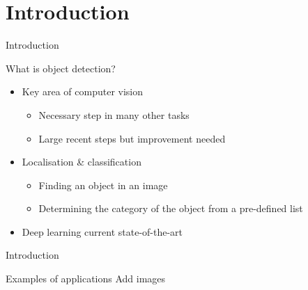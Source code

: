 \section{Introduction}
\begin{frame}{Introduction}{}
    \begin{block}{}
        What is object detection?
        \begin{itemize}
            \item Key area of computer vision
                \begin{itemize}
                    \item Necessary step in many other tasks
                    \item Large recent steps but improvement needed
                \end{itemize}
        \end{itemize}
        \begin{itemize}
            \item Localisation \& classification
                \begin{itemize}
                    \item Finding an object in an image
                    \item Determining the category of the object from a pre-defined list
                \end{itemize}
        \end{itemize}
        \begin{itemize}
            \item Deep learning current state-of-the-art
        \end{itemize}
    \end{block}
\end{frame}

\begin{frame}{Introduction}{}
    \begin{block}{}
        Examples of applications
        Add images
    \end{block}
\end{frame}




